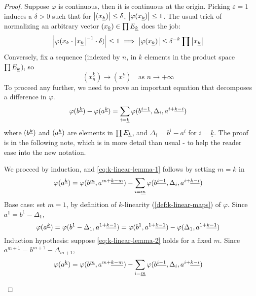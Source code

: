 \documentclass[../main-manifolds.tex]{subfiles}
\begin{document}
\begin{proof}
    Suppose $\varphi$ is continuous, then it is continuous at the origin. Picking $\varepsilon = 1$ induces a $\delta>0$ such that for $\abs{(\UL{x}[k])}\leq \delta$, $\abs{\varphi(\UL{x}[k])}\leq 1$. The usual trick of normalizing an arbitrary vector $(\UL{x}[k])\in \prod \UL{E}[k]$ does the job:
    \[
        \abs{\varphi(x_k\cdot \abs{\UL{x}[k]}^{-1}\cdot\delta)}\leq 1\implies \abs{\varphi(\UL{x}[k])}\leq \delta^{-k}\prod\abs{\UL{x}[k]}
    \]
    Conversely, fix a sequence (indexed by $n$, in $k$ elements in the product space $\prod\UL{E}[k]$), so
    \begin{equation}\label{eq:k-linear-sequence-def}
        (x_n^{\underline{k}})\to (x^{\underline{k}})\quad \text{as } n\to +\infty
    \end{equation}
    To proceed any further, we need to prove an important equation that decomposes a difference in $\varphi$.
    \begin{equation}\label{eq:k-linear-lemma-1}
        \varphi(\UPL{b}[k]) - \varphi(\UPL{a}[k]) = \sum_{i=\underline{k}}\varphi(\UPL{b}[i-1],\Delta_i, \UPL{a}[i+][k-i])
    \end{equation}
    where $(\UPL{b}[k])$ and $(\UPL{a}[k])$ are elements in $\prod \UL{E}[k]$, and $\Delta_i = b^i - a^i$ for $i = \underline{k}$. The proof is in the following note, which is in more detail than usual - to help the reader ease into the new notation.
    \begin{note}
        We proceed by induction, and \cref{eq:k-linear-lemma-1} follows by setting $m=k$ in
        \begin{equation}\label{eq:k-linear-lemma-2}
            \varphi(\UPL{a}[k]) = \varphi(\UPL{b}[m],\UPL{a}[m+][k-m]) - \sum_{i=\underline{m}}\varphi(\UPL{b}[i-1],\Delta_i,\UPL{a}[i+][k-i])
        \end{equation}
        Base case: set $m=1$, by definition of $k$-linearity (\cref{def:k-linear-maps}) of $\varphi$. Since $a^1 = b^1-\Delta_1$, 
        \[
            \varphi(\UPL{a}[k]) = \varphi(b^1-\Delta_1, \UPL{a}[1+][k-1]) = \varphi(b^1, \UPL{a}[1+][k-1]) - \varphi(\Delta_1,\UPL{a}[1+][k-1])
        \]
        Induction hypothesis: suppose \cref{eq:k-linear-lemma-2} holds for a fixed $m$. Since $a^{m+1} = b^{m+1} - \Delta_{m+1}$, 
        \begin{align*}
            \varphi(\UPL{a}[k]) &= \varphi(\UPL{b}[m],\UPL{a}[m+][k-m]) - \sum_{i=\underline{m}}\varphi(\UPL{b}[i-1],\Delta_i,\UPL{a}[i+][k-i])\\

\end{align*}
\end{note}
\end{proof}
\end{document}
